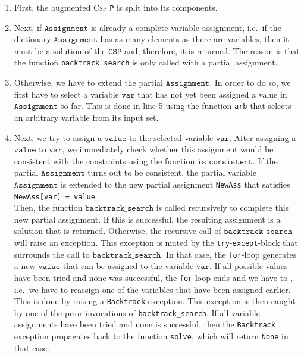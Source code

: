 \begin{enumerate}
\item First, the augmented \textsc{Csp} \texttt{P} is split into its components.
\item Next, if $\texttt{Assignment}$ is already a complete variable assignment, i.e.~if the dictionary
      $\texttt{Assignment}$ has as many elements as there are variables, then it must be a solution of
      the $\texttt{CSP}$ and, therefore, it is returned.  The reason is that the function
      \texttt{backtrack\_search} is only called with a  partial assignment.
\item Otherwise, we have to extend the partial $\texttt{Assignment}$.  In order to do so, we first have to
      select a variable $\texttt{var}$ that has not yet been assigned a value in $\texttt{Assignment}$ so far.
      This is done in line 5 using the function \texttt{arb} that selects an arbitrary variable
      from its input set.  
\item Next, we try to assign a $\texttt{value}$ to the selected variable $\texttt{var}$.  After assigning
      a $\texttt{value}$ to $\texttt{var}$, we immediately check whether this assignment would be consistent
      with the constraints using the function $\texttt{is\_consistent}$.
      If the partial $\texttt{Assignment}$ turns out to be consistent, the partial variable $\texttt{Assignment}$
      is extended to the new partial assignment \texttt{NewAss} that satisfies
      \\[0.2cm]
      \hspace*{1.3cm}
      \texttt{NewAss[var] = value}.
      \\[0.2cm]
      Then, the function $\texttt{backtrack\_search}$ is called recursively to complete this new partial assignment.
      If this is successful, the resulting assignment is a solution that is returned.  Otherwise,
      the recursive call of $\texttt{backtrack\_search}$ will raise an exception.  This exception is muted 
      by the \texttt{try}-\texttt{except}-block that surrounds the call to $\texttt{backtrack\_search}$.  In that case, the
      \texttt{for}-loop generates a new $\texttt{value}$ that can be assigned to the variable
      $\texttt{var}$.  If all possible values have been tried and none was successful, the \texttt{for}-loop
      ends and we have to , i.e.~we have to reassign one of the variables that have been
      assigned earlier.  This is done by raising a \texttt{Backtrack} exception.  This exception is then caught
      by one of the prior invocations of \texttt{backtrack\_search}.  If all variable assignments have been
      tried and none is successful, then the \texttt{Backtrack} exception propagates back to the function
      \texttt{solve}, which will return \texttt{None} in that case.
\end{enumerate}



